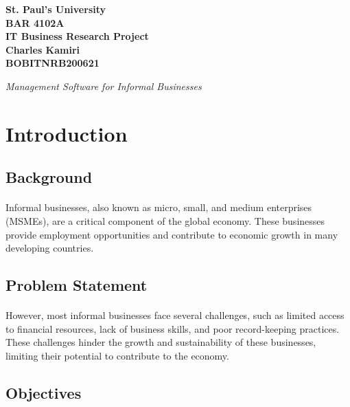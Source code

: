\documentclass{article}
\begin{document}
\renewcommand{\familydefault}{\sfdefault}
\renewcommand{\baselinestretch}{1.5}
\setlength{\parskip}{0.5em}
\setlength{\parindent}{0pt}
\setlength{\textwidth}{6.5in}
\setlength{\textheight}{9.5in}
\setlength{\topmargin}{-0.5in}

\thispagestyle{empty}
\begin{center}
	{\bfseries\huge
		St. Paul's University \\
		BAR 4102A \\
		IT Business Research Project \\
		Charles Kamiri  \\
		BOBITNRB200621 \\ [60pt]
	}

\emph{Management Software for Informal Businesses}
\end{center}
\newpage


\thispagestyle{empty}
\renewcommand{\contentsname}{Table of Contents}
\tableofcontents
\newpage


\section{Introduction}
\subsection{Background}
\paragraph{}
Informal businesses, also known as micro, small, and medium enterprises (MSMEs), are a critical component of the global economy. These businesses provide employment opportunities and contribute to economic growth in many developing countries.

\subsection{Problem Statement}
\paragraph*{}
However, most informal businesses face several challenges, such as limited access to financial resources, lack of business skills, and poor record-keeping practices. These challenges hinder the growth and sustainability of these businesses, limiting their potential to contribute to the economy.

\subsection{Objectives}
\end{document}
